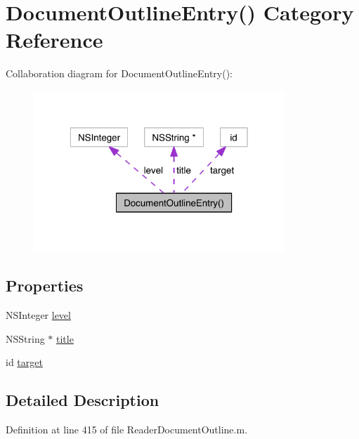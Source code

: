 \hypertarget{category_document_outline_entry_07_08}{\section{Document\-Outline\-Entry() Category Reference}
\label{d8/da4/category_document_outline_entry_07_08}
}


Collaboration diagram for Document\-Outline\-Entry()\-:
\nopagebreak
\begin{figure}[H]
\begin{center}
\leavevmode
\includegraphics[width=268pt]{d1/dea/category_document_outline_entry_07_08__coll__graph}
\end{center}
\end{figure}
\subsection*{Properties}
\begin{DoxyCompactItemize}
\item 
N\-S\-Integer \hyperlink{category_document_outline_entry_07_08_a528b075edd4071b08259d6012a2040af}{level}
\item 
N\-S\-String $\ast$ \hyperlink{category_document_outline_entry_07_08_ab0bc837797c044f995cd199643689617}{title}
\item 
id \hyperlink{category_document_outline_entry_07_08_a9da4d185e33f0c043de7420cd009f8dd}{target}
\end{DoxyCompactItemize}


\subsection{Detailed Description}


Definition at line 415 of file Reader\-Document\-Outline.\-m.



